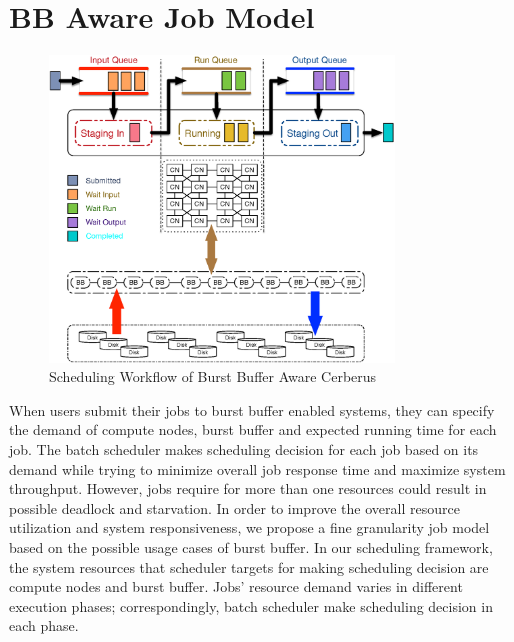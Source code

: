 \section{BB Aware Job Model}
\label{Sec:Model}

\begin{figure}[htp]
        \centering
        \includegraphics[width=3.6in]{CerberusBBSystem}
        \caption{Scheduling Workflow of Burst Buffer Aware Cerberus}
        \label{Fig:CerberusQueues}
\end{figure}



When users submit their jobs to burst buffer enabled systems, they can specify the 
demand of compute nodes, burst buffer and expected running time for each job.
The batch scheduler makes scheduling decision for each job based on its demand while trying to 
minimize overall job response time and maximize system throughput. 
However, jobs require for more than one resources could result in possible deadlock and starvation.
In order to improve the overall resource utilization and system responsiveness, we propose
a fine granularity job model based on the possible usage cases of burst buffer.  
In our scheduling framework, 
the system resources that scheduler targets for making scheduling decision are
compute nodes and burst buffer.
Jobs' resource demand varies in different execution phases;
correspondingly, batch scheduler make scheduling decision in each phase.


